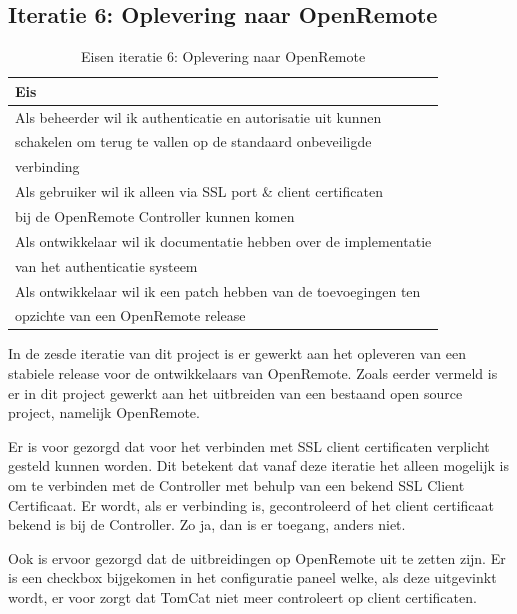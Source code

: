 \documentclass[]{article}
\begin{document}
\subsection{Iteratie 6: Oplevering naar OpenRemote}
\begin{table}[htpb]
  \caption{Eisen iteratie 6: Oplevering naar OpenRemote}
  \begin{center}
    \begin{tabular}{|| l ||}\hline
        Eis                                                              \\\hline\hline
        Als beheerder wil ik authenticatie en autorisatie uit kunnen    \\
        schakelen om terug te vallen op de standaard onbeveiligde        \\ 
        verbinding                                                       \\\hline
        Als gebruiker wil ik alleen via SSL port \& client certificaten  \\ 
        bij de OpenRemote Controller kunnen komen                        \\\hline
        Als ontwikkelaar wil ik documentatie hebben over de implementatie\\ 
        van het authenticatie systeem                                    \\\hline
        Als ontwikkelaar wil ik een patch hebben van de toevoegingen ten \\
        opzichte van een OpenRemote release                              \\\hline
    \end{tabular}
  \end{center}
\end{table}

In de zesde iteratie van dit project is er gewerkt aan het opleveren van een
stabiele release voor de ontwikkelaars van OpenRemote. Zoals eerder vermeld is
er in dit project gewerkt aan het uitbreiden van een bestaand open source
project, namelijk OpenRemote. 

Er is voor gezorgd dat voor het verbinden met SSL client certificaten verplicht
gesteld kunnen worden. Dit betekent dat vanaf deze iteratie het alleen mogelijk is
om te verbinden met de Controller met behulp van een bekend SSL Client
Certificaat. Er wordt, als er verbinding is, gecontroleerd of het client certificaat bekend
is bij de Controller. Zo ja, dan is er toegang, anders niet.

Ook is ervoor gezorgd dat de uitbreidingen op OpenRemote uit te zetten
zijn. Er is een checkbox bijgekomen in het configuratie paneel welke, als
deze uitgevinkt wordt, er voor zorgt dat TomCat niet meer controleert op client
certificaten. 
\end{document}
